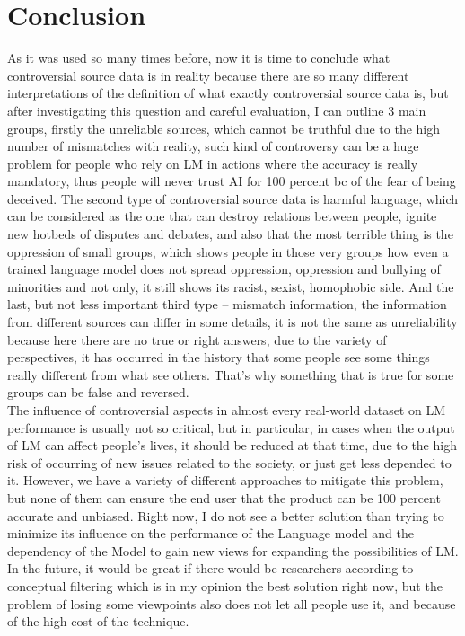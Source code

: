 \section{Conclusion}
 As it was used so many times before, now it is time to conclude what controversial source data is in reality because there are so many different interpretations of the definition of what exactly controversial source data is, but after investigating this question and careful evaluation, I can outline 3 main groups, firstly the unreliable sources, which cannot be truthful due to the high number of mismatches with reality, such kind of controversy can be a huge problem for people who rely on LM in actions where the accuracy is really mandatory, thus people will never trust AI for 100 percent bc of the fear of being deceived. The second type of controversial source data is harmful language, which can be considered as the one that can destroy relations between people, ignite new hotbeds of disputes and debates, and also that the most terrible thing is the oppression of small groups, which shows people in those very groups how even a trained language model does not spread oppression, oppression and bullying of minorities and not only, it still shows its racist, sexist, homophobic side. And the last, but not less important third type – mismatch information, the information from different sources can differ in some details, it is not the same as unreliability because here there are no true or right answers, due to the variety of perspectives, it has occurred in the history that some people see some things really different from what see others. That's why something that is true for some groups can be false and reversed. \\
 
The influence of controversial aspects in almost every real-world dataset on LM performance is usually not so critical, but in particular, in cases when the output of LM can affect people’s lives, it should be reduced at that time, due to the high risk of occurring of new issues related to the society, or just get less depended to it. However, we have a variety of different approaches to mitigate this problem, but none of them can ensure the end user that the product can be 100 percent accurate and unbiased. Right now, I do not see a better solution than trying to minimize its influence on the performance of the Language model and the dependency of the Model to gain new views for expanding the possibilities of LM. In the future, it would be great if there would be researchers according to conceptual filtering which is in my opinion the best solution right now, but the problem of losing some viewpoints also does not let all people use it, and because of the high cost of the technique. 

 